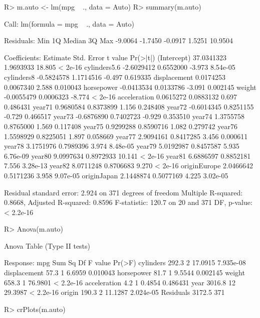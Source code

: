 \documentclass[
]{jss}
\begin{document}
\begin{CodeChunk}
\begin{CodeInput}
R> m.auto <- lm(mpg ~ ., data = Auto)
R> summary(m.auto)
\end{CodeInput}
\begin{CodeOutput}

Call:
lm(formula = mpg ~ ., data = Auto)

Residuals:
    Min      1Q  Median      3Q     Max 
-9.0064 -1.7450 -0.0917  1.5251 10.9504 

Coefficients:
               Estimate Std. Error t value Pr(>|t|)
(Intercept)  37.0341323  1.9693933  18.805  < 2e-16
cylinders5.6 -2.6029412  0.6552000  -3.973 8.54e-05
cylinders8   -0.5824578  1.1714516  -0.497 0.619335
displacement  0.0174253  0.0067340   2.588 0.010043
horsepower   -0.0413534  0.0133786  -3.091 0.002145
weight       -0.0055479  0.0006323  -8.774  < 2e-16
acceleration  0.0615272  0.0883132   0.697 0.486431
year71        0.9680584  0.8373899   1.156 0.248408
year72       -0.6014345  0.8251155  -0.729 0.466517
year73       -0.6876890  0.7402723  -0.929 0.353510
year74        1.3755758  0.8765000   1.569 0.117408
year75        0.9299288  0.8590716   1.082 0.279742
year76        1.5598929  0.8225051   1.897 0.058669
year77        2.9094161  0.8417285   3.456 0.000611
year78        3.1751976  0.7989396   3.974 8.48e-05
year79        5.0192987  0.8457587   5.935 6.76e-09
year80        9.0997634  0.8972933  10.141  < 2e-16
year81        6.6886597  0.8852181   7.556 3.28e-13
year82        8.0711248  0.8706683   9.270  < 2e-16
originEurope  2.0466642  0.5171236   3.958 9.07e-05
originJapan   2.1448874  0.5077169   4.225 3.02e-05

Residual standard error: 2.924 on 371 degrees of freedom
Multiple R-squared:  0.8668,    Adjusted R-squared:  0.8596 
F-statistic: 120.7 on 20 and 371 DF,  p-value: < 2.2e-16
\end{CodeOutput}
\begin{CodeInput}
R> Anova(m.auto)
\end{CodeInput}
\begin{CodeOutput}
Anova Table (Type II tests)

Response: mpg
             Sum Sq  Df F value    Pr(>F)
cylinders     292.3   2 17.0915 7.935e-08
displacement   57.3   1  6.6959  0.010043
horsepower     81.7   1  9.5544  0.002145
weight        658.3   1 76.9801 < 2.2e-16
acceleration    4.2   1  0.4854  0.486431
year         3016.8  12 29.3987 < 2.2e-16
origin        190.3   2 11.1287 2.024e-05
Residuals    3172.5 371                  
\end{CodeOutput}
\begin{CodeInput}
R> crPlots(m.auto)
\end{CodeInput}
\begin{figure}


\end{figure}
\end{CodeChunk}
\end{document}
